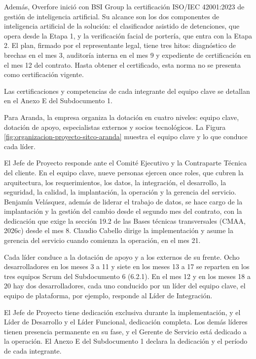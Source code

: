 \documentclass[subdoc]{../../comun/overfore}
\begin{document}
Además, Overfore inició con BSI Group la certificación ISO/IEC 42001:2023 de gestión de inteligencia artificial. Su alcance son los dos componentes de inteligencia artificial de la solución: el clasificador asistido de detenciones, que opera desde la Etapa 1, y la verificación facial de portería, que entra con la Etapa 2. El plan, firmado por el representante legal, tiene tres hitos: diagnóstico de brechas en el mes 3, auditoría interna en el mes 9 y expediente de certificación en el mes 12 del contrato. Hasta obtener el certificado, esta norma no se presenta como certificación vigente.

Las certificaciones y competencias de cada integrante del equipo clave se detallan en el Anexo E del Subdocumento 1.

Para Aranda, la empresa organiza la dotación en cuatro niveles: equipo clave, dotación de apoyo, especialistas externos y socios tecnológicos. La Figura \ref{fig:organizacion-proyecto-sitco-aranda} muestra el equipo clave y lo que conduce cada líder.

El Jefe de Proyecto responde ante el Comité Ejecutivo y la Contraparte Técnica del cliente. En el equipo clave, nueve personas ejercen once roles, que cubren la arquitectura, los requerimientos, los datos, la integración, el desarrollo, la seguridad, la calidad, la implantación, la operación y la gerencia del servicio. Benjamín Velásquez, además de liderar el trabajo de datos, se hace cargo de la implantación y la gestión del cambio desde el segundo mes del contrato, con la dedicación que exige la sección 19.2 de las Bases técnicas transversales (CMAA, 2026c) desde el mes 8. Claudio Cabello dirige la implementación y asume la gerencia del servicio cuando comienza la operación, en el mes 21.

Cada líder conduce a la dotación de apoyo y a los externos de su frente. Ocho desarrolladores en los meses 3 a 11 y siete en los meses 13 a 17 se reparten en los tres equipos Scrum del Subdocumento 6 (6.2.1). En el mes 12 y en los meses 18 a 20 hay dos desarrolladores, cada uno conducido por un líder del equipo clave, el equipo de plataforma, por ejemplo, responde al Líder de Integración.

El Jefe de Proyecto tiene dedicación exclusiva durante la implementación, y el Líder de Desarrollo y el Líder Funcional, dedicación completa. Los demás líderes tienen presencia permanente en su fase, y el Gerente de Servicio está dedicado a la operación. El Anexo E del Subdocumento 1 declara la dedicación y el período de cada integrante.
\end{document}
